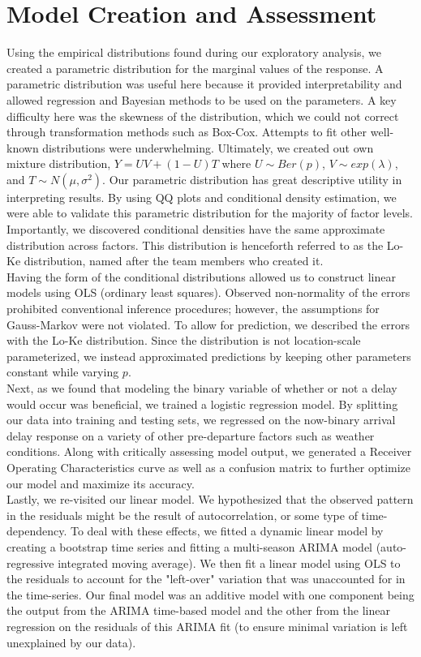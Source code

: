 \documentclass[12pt, a4paper, openany]{book}
\newcommand\tab[1][1cm]{\hspace*{#1}}
\begin{document}
	\section{Model Creation and Assessment}
\tab Using the empirical distributions found during our exploratory analysis, we created a parametric distribution for the marginal values of the response. A parametric distribution was useful here because it provided interpretability and allowed regression and Bayesian methods to be used on the parameters. A key difficulty here was the skewness of the distribution, which we could not correct through transformation methods such as Box-Cox. Attempts to fit other well-known distributions were underwhelming. Ultimately, we created out own mixture distribution, $Y = UV+(1-U)T$ where $U\sim Ber(p)$, $V\sim exp(\lambda)$, and $T\sim N(\mu, \sigma^2)$. Our parametric distribution has great descriptive utility in interpreting results. By using QQ plots and conditional density estimation, we were able to validate this parametric distribution for the majority of factor levels. Importantly, we discovered conditional densities have the same approximate distribution across factors. This distribution is henceforth referred to as the Lo-Ke distribution, named after the team members who created it. \\
\tab Having the form of the conditional distributions allowed us to construct linear models using OLS (ordinary least squares). Observed non-normality of the errors prohibited conventional inference procedures; however, the assumptions for Gauss-Markov were not violated. To allow for prediction, we described the errors with the Lo-Ke distribution. Since the distribution is not location-scale parameterized, we instead approximated predictions by keeping other parameters constant while varying $p$. \\
\tab Next, as we found that modeling the binary variable of whether or not a delay would occur was beneficial, we trained a logistic regression model. By splitting our data into training and testing sets, we regressed on the now-binary arrival delay response on a variety of other pre-departure factors such as weather conditions. Along with critically assessing model output, we generated a Receiver Operating Characteristics curve as well as a confusion matrix to further optimize our model and maximize its accuracy. \\
\tab Lastly, we re-visited our linear model. We hypothesized that the observed pattern in the residuals might be the result of autocorrelation, or some type of time-dependency. To deal with these effects, we fitted a dynamic linear model by creating a bootstrap time series and fitting a multi-season ARIMA model (auto-regressive integrated moving average). We then fit a linear model using OLS to the residuals to account for the "left-over" variation that was unaccounted for in the time-series. Our final model was an additive model with one component being the output from the ARIMA time-based model and the other from the linear regression on the residuals of this ARIMA fit (to ensure minimal variation is left unexplained by our data).
\end{document}
